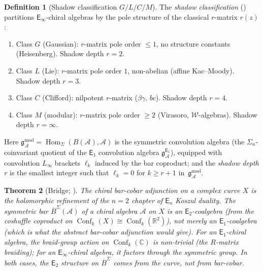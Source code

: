 \documentclass[11pt,reqno]{amsart}
\newtheorem{theorem}{Theorem}[section]
\theoremstyle{definition}
\newtheorem{definition}[theorem]{Definition}
\theoremstyle{remark}
\newcommand{\cA}{\mathcal{A}}
\newcommand{\cW}{\mathcal{W}}
\newcommand{\Eone}{\mathsf{E}_{1}}
\newcommand{\Etwo}{\mathsf{E}_{2}}
\newcommand{\En}{\mathsf{E}_{n}}
\newcommand{\Einf}{\mathsf{E}_{\infty}}
\DeclareMathOperator{\Hom}{Hom}
\DeclareMathOperator{\Conf}{Conf}
\newcommand{\gmod}{\mathfrak{g}^{\mathrm{mod}}_{\cA}}
\newcommand{\gEone}{\mathfrak{g}^{\Eone}_{\cA}}
\newcommand{\BarSig}{\overline{B}^{\Sigma}}
\newcommand{\CC}{\mathbb{C}}
\newcommand{\RR}{\mathbb{R}}
\numberwithin{equation}{section}
\begin{document}
\begin{definition}[Shadow classification $G/L/C/M$]
\label{def:glcm}
The \emph{shadow classification}
\textup{(}\cite[\S II]{Lorgat26I}\textup{)} partitions
$\Einf$-chiral algebras by the pole structure of the
classical $r$-matrix $r(z)$:
\begin{enumerate}[label=\textup{(\roman*)}]
\item Class $G$ \textup{(}Gaussian\textup{)}: $r$-matrix
  pole order $\leq 1$, no structure constants
  \textup{(}Heisenberg\textup{)}. Shadow depth $r = 2$.
\item Class $L$ \textup{(}Lie\textup{)}: $r$-matrix pole
  order $1$, non-abelian \textup{(}affine
  Kac--Moody\textup{)}. Shadow depth $r = 3$.
\item Class $C$ \textup{(}Clifford\textup{)}: nilpotent
  $r$-matrix \textup{(}$\beta\gamma$, $bc$\textup{)}.
  Shadow depth $r = 4$.
\item Class $M$ \textup{(}modular\textup{)}: $r$-matrix
  pole order $\geq 2$ \textup{(}Virasoro,
  $\cW$-algebras\textup{)}. Shadow depth $r = \infty$.
\end{enumerate}
Here $\gmod = \Hom_{\Sigma}(B(\cA), \cA)$ is the symmetric
convolution algebra (the $\Sigma_n$-coinvariant quotient of
the $\Eone$ convolution algebra $\gEone$), equipped with
convolution $L_\infty$ brackets $\ell_k$ induced by the bar
coproduct; and the \emph{shadow depth} $r$ is the smallest
integer such that $\ell_k = 0$ for $k \geq r + 1$
in~$\gmod$.
\end{definition}

\begin{theorem}[Bridge; {\cite[Theorem~1.1(ii)]{Lorgat26I}}]
\label{thm:bridge}
The chiral bar-cobar adjunction on a complex curve $X$
is the holomorphic refinement of the $n = 2$ chapter of
$\En$ Koszul duality. The symmetric bar $\BarSig(\cA)$
of a chiral algebra $\cA$ on $X$ is an
$\Etwo$-coalgebra \textup{(}from the coshuffle coproduct
on $\Conf_k(X) \cong \Conf_k(\RR^2)$\textup{)}, not
merely an $\Eone$-coalgebra \textup{(}which is what the
abstract bar-cobar adjunction would give\textup{)}.
For an $\Eone$-chiral algebra, the braid-group action
on $\Conf_k(\CC)$ is non-trivial \textup{(}the
$R$-matrix braiding\textup{)}; for an $\Einf$-chiral
algebra, it factors through the symmetric group.
In both cases, the $\Etwo$ structure on $\BarSig$
comes from the curve, not from bar-cobar.
\end{theorem}
\end{document}

